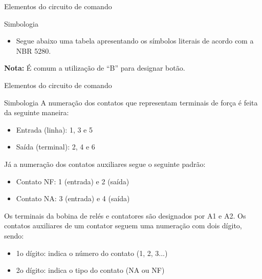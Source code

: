 \begin{frame}{Elementos do circuito de comando}
\begin{block}{Simbologia}
	\begin{itemize}
		\item Segue abaixo uma tabela apresentando os símbolos literais de acordo com a NBR 5280.
	\end{itemize}
	 \textbf{Nota:} É comum a utilização de ``B'' para designar botão.
\end{block}
\begin{table}[h]
\end{table}
\end{frame}


\begin{frame}{Elementos do circuito de comando}
\begin{block}{Simbologia}
	A numeração dos contatos que representam terminais de força é feita da seguinte maneira:
	\begin{itemize}
		\item Entrada (linha): 1, 3 e 5
		\item Saída (terminal): 2, 4 e 6
	\end{itemize}
	Já a numeração dos contatos auxiliares segue o seguinte padrão:
	\begin{itemize}
		\item Contato NF: 1 (entrada) e 2 (saída)
		\item Contato NA: 3 (entrada) e 4 (saída)
	\end{itemize}
	Os terminais da bobina de relés e contatores são designados por A1 e A2. Os contatos auxiliares de um contator seguem uma numeração com dois dígito, sendo:
	\begin{itemize}
		\item 1o dígito: indica o número do contato (1, 2, 3...)
		\item 2o dígito: indica o tipo do contato (NA ou NF)
	\end{itemize}
\end{block}
\end{frame}


